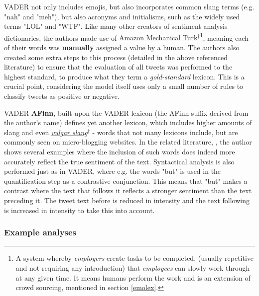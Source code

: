 \documentclass{article}
\begin{document}
VADER not only includes emojis, but also incorporates common slang terms (e.g. "nah" and "meh"), but also acronyms and initialisms, such as the widely used terms "LOL" and "WTF". Like many other creators of sentiment analysis dictionaries, the authors made use of \href{https://www.mturk.com/mturk/welcome}{Amazon Mechanical Turk$^{\dag{}}$}\footnote{A system whereby \emph{employers} create tasks to be completed, (usually repetitive and not requiring any introduction) that \emph{employees} can slowly work through at any given time. It means humans perform the work and is an extension of crowd sourcing, mentioned in section \ref{emolex}.}, meaning each of their words was \textbf{manually} assigned a value by a human. The authors also created some extra steps to this process (detailed in the above referenced literature) to ensure that the evaluation of all tweets was performed to the highest standard, to produce what they term a \emph{gold-standard} lexicon. This is a crucial point, considering the model itself uses only a small number of rules to classify tweets as positive or negative.

\vspace{5mm}
VADER \textbf{AFinn}, built upon the VADER lexicon (the AFinn suffix derived from the author's name) defines yet another lexicon, which includes higher amounts of slang and even \href{https://simple.wiktionary.org/wiki/Category:Vulgar}{\emph{vulgar slang$^{\dag{}}$}} - words that not many lexicons include, but are commonly seen on micro-blogging websites. In the related literature, \cite{NielsenF2011New}, the author shows several examples where the inclusion of such words does indeed more accurately reflect the true sentiment of the text. Syntactical analysis is also performed just as in VADER, where e.g. the words "but" is used in the quantification step as a contrastive conjunction. This means that "but" makes a contrast where the text that follows it reflects a stronger sentiment than the text preceding it. The tweet text before is reduced in intensity and the text following is increased in intensity to take this into account.


\subsubsection{Example analyses}
\label{sec-4-4-5}
\end{document}
